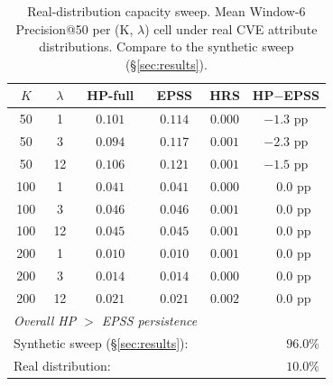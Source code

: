 \begin{table}[!t]
 \caption{Real-distribution capacity sweep. Mean Window-6 Precision@50
 per (K, $\lambda$) cell under real CVE attribute distributions.
 Compare to the synthetic sweep (\S\ref{sec:results}).}
 \label{tab:real_dist_capacity}
 \centering
 \small
 \setlength{\tabcolsep}{4pt}
 \begin{tabular}{@{}cc cccc@{}}
 \toprule
 $K$ & $\lambda$ & \textbf{HP-full} & \textbf{EPSS} & \textbf{HRS} & \textbf{HP$-$EPSS} \\
 \midrule
 50 & 1 & $0.101$ & $0.114$ & $0.000$ & $-1.3$ pp \\
 50 & 3 & $0.094$ & $0.117$ & $0.001$ & $-2.3$ pp \\
 50 & 12 & $0.106$ & $0.121$ & $0.001$ & $-1.5$ pp \\
 100 & 1 & $0.041$ & $0.041$ & $0.000$ & $\phantom{-}0.0$ pp \\
 100 & 3 & $0.046$ & $0.046$ & $0.001$ & $\phantom{-}0.0$ pp \\
 100 & 12 & $0.045$ & $0.045$ & $0.001$ & $\phantom{-}0.0$ pp \\
 200 & 1 & $0.010$ & $0.010$ & $0.001$ & $\phantom{-}0.0$ pp \\
 200 & 3 & $0.014$ & $0.014$ & $0.000$ & $\phantom{-}0.0$ pp \\
 200 & 12 & $0.021$ & $0.021$ & $0.002$ & $\phantom{-}0.0$ pp \\
 \midrule
 \multicolumn{4}{l}{\textit{Overall HP $>$ EPSS persistence}} & \multicolumn{2}{r}{} \\
 \multicolumn{4}{l}{\quad Synthetic sweep (\S\ref{sec:results}):} & \multicolumn{2}{r}{$96.0\%$} \\
 \multicolumn{4}{l}{\quad Real distribution:} & \multicolumn{2}{r}{$10.0\%$} \\
 \bottomrule
 \end{tabular}
\end{table}
